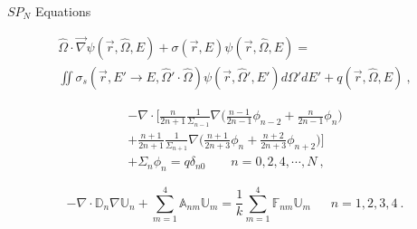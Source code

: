 \documentclass{beamer}
\begin{document}
\begin{frame}{$SP_N$ Equations}

  \begin{multline}
    \hat{\Omega} \cdot \vec{\nabla} \psi(\vec{r},\hat{\Omega},E) +
    \sigma(\vec{r},E) \psi(\vec{r},\hat{\Omega},E) = \\ \iint
    \sigma_s(\vec{r},E' \rightarrow E,\hat{\Omega}' \cdot \hat{\Omega})
    \psi(\vec{r},\hat{\Omega}',E') d\Omega' dE' +
    q(\vec{r},\hat{\Omega},E)\:,
    \label{eq:general_transport}
  \end{multline}

  \smallskip

  \begin{multline}
    -\nabla \cdot \Bigg[\frac{n}{2n+1}\frac{1}{\Sigma_{n-1}} \nabla
      \Big(\frac{n-1}{2n-1} \phi_{n-2} + \frac{n}{2n-1}\phi_n \Big) \\+
      \frac{n+1}{2n+1}\frac{1}{\Sigma_{n+1}} \nabla
      \Big(\frac{n+1}{2n+3}\phi_n + \frac{n+2}{2n+3}\phi_{n+2}\Big)
      \Bigg] \\+ \Sigma_n \phi_n = q \delta_{n0}\ \ \ \ \ \ \ \ \ n =
    0,2,4,\cdots,N\:,
    \label{eq:spn_equations}
  \end{multline}

  \smallskip

  \begin{equation}
    -\nabla \cdot \mathbb{D}_n \nabla \mathbb{U}_n + \sum_{m=1}^4
    \mathbb{A}_{nm} \mathbb{U}_m = \frac{1}{k} \sum_{m=1}^4
    \mathbb{F}_{nm} \mathbb{U}_m\ \ \ \ \ \ \ n = 1,2,3,4\:.
    \label{eq:spn_fission_matrix}
  \end{equation}

\end{frame}
\end{document}
